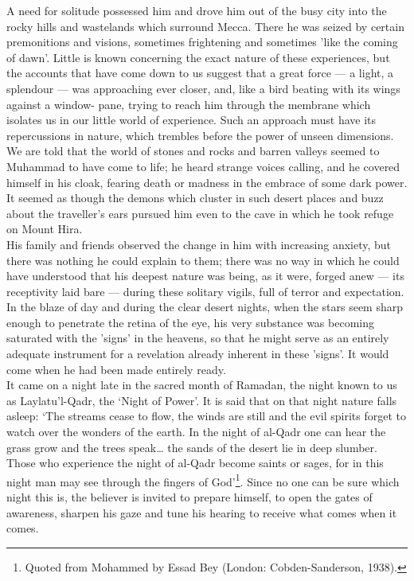 \documentclass[10pt, twoside,openright]{book}
\begin{document}
A need for solitude possessed him and drove him out of the busy city into the rocky hills and 
wastelands which surround Mecca. There he was seized by certain premonitions and visions, sometimes 
frightening and sometimes 'like the coming of dawn'. Little is known concerning the exact nature of 
these experiences, but the accounts that have come down to us suggest that a great force --- a light, a 
splendour --- was approaching ever closer, and, like a bird beating with its wings against a window\hyp{}
pane, trying to reach him through the membrane which isolates us in our little world of experience. 
Such an approach must have its repercussions in nature, which trembles before the power of unseen 
dimensions. We are told that the world of stones and rocks and barren valleys seemed to Muhammad to 
have come to life; he heard strange voices calling, and he covered himself in his cloak, fearing 
death or madness in the embrace of some dark power. It seemed as though the demons which cluster in 
such desert places and buzz about the traveller's ears pursued him even to the cave in which he took 
refuge on Mount Hira. \\

His family and friends observed the change in him with increasing anxiety, but there was nothing he 
could explain to them; there was no way in which he could have understood that his deepest nature was 
being, as it were, forged anew --- its receptivity laid bare --- during these solitary vigils, full of 
terror and expectation. In the blaze of day and during the clear desert nights, when the stars seem 
sharp enough to penetrate the retina of the eye, his very substance was becoming saturated with the 
'signs' in the heavens, so that he might serve as an entirely adequate instrument for a revelation 
already inherent in these 'signs'. It would come when he had been made entirely ready. \\

It came on a night late in the sacred month of Ramadan, the night known to us as Laylatu'l\hyp{}Qadr, the 
`Night of Power'. It is said that on that night nature falls asleep: `The streams cease to flow, the 
winds are still and the evil spirits forget to watch over the wonders of the earth. In the night of 
al\hyp{}Qadr one can hear the grass grow and the trees speak\ldots{} the sands of the desert lie in deep 
slumber. Those who experience the night of al\hyp{}Qadr become saints or sages, for in this night man may 
see through the fingers of God'\footnote{Quoted from Mohammed by Essad Bey (London: Cobden\hyp{}Sanderson, 1938).}. Since no one can be sure which night this is, the believer is 
invited to prepare himself, to open the gates of awareness, sharpen his gaze and tune his hearing to 
receive what comes when it comes. \\
\end{document}
